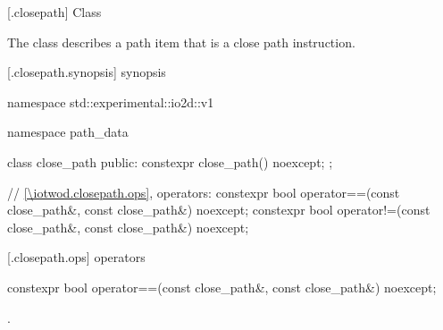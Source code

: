  [\iotwod.closepath] {Class }%

\pnum
{}
The class  describes a path item that is a close path instruction.

 [\iotwod.closepath.synopsis] { synopsis}%

\begin{codeblock}
namespace std::experimental::io2d::v1 {
  namespace path_data {
    class close_path {
    public:
      constexpr close_path() noexcept;
    };
    
    // \ref{\iotwod.closepath.ops}, operators:
    constexpr bool operator==(const close_path&, const close_path&) noexcept;
    constexpr bool operator!=(const close_path&, const close_path&) noexcept;
  }
}
\end{codeblock}

 [\iotwod.closepath.ops]{ operators}%

%
\begin{itemdecl}
constexpr bool operator==(const close_path&, const close_path&) noexcept;
\end{itemdecl}
\begin{itemdescr}
\pnum
\returns
{}.
\end{itemdescr}
